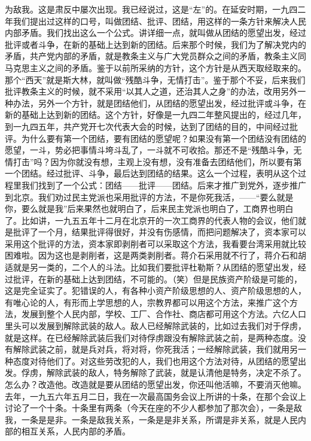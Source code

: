 为敌我。这是肃反中屡次出现。我已经说过，这是“左”的。在延安时期，一九四二年我们提出过这样的口号，叫做团结、批评、团结，用这样的一条方针来解决人民内部矛盾。我们找出这么一个公式。讲详细一点，就叫做从团结的愿望出发，经过批评或者斗争，在新的基础上达到新的团结。后来那个时候，我们为了解决党内的矛盾，共产党内部的矛盾，就是教条主义与广大党员群众之间的矛盾，教条主义同马克思主义之间的矛盾。鉴于以前所采纳的方针，这个方针是从西天取经取来的。那个“西天”就是斯大林，就叫做“残酷斗争，无情打击”。鉴于那个不妥，后来我们批评教条主义的时候，就不采用“以其人之道，还治其人之身”的办法，改用另外一种办法，另外一个方针，就是团结他们，从团结的愿望出发，经过批评或斗争，在新的基础上达到新的团结。这个方针，好像是一九四二年整风提出的，经过几年，到一九四五年，共产党开七次代表大会的时候，达到了团结的目的，中间经过批评。为什么要有第一个团结，要有团结的愿望呢？如果没有第一个团结没有团结的愿望，一斗，势必把事情斗垮斗乱了，一斗就不可收拾。那还不是“残酷斗争，无情打击”吗？因为你就没有想，主观上没有想，没有准备去团结他们，所以要有第一个团结。经过批评、斗争，最后达到团结的结果。这么一个过程，表明从这个过程里我们找到了一个公式：团结——批评——团结。后来才推广到党外，逐步推广到北京。我们劝过民主党派也采用批评的方法，不是你死我活，——“要么就是你，要么就是我”后来果然也就明白了，后来民主党派也明白了，工商界也明白了。比如讲，一九五五年十二月在北京开的一次工商界的代表人物的会议，他们就是批评了一个月，结果批评得很好，并没有伤感情，而把问题解决了，资本家可以采用这个批评的方法，资本家即剥削者可以采取这个方法，我看要台湾采用就比较困难啦。因为这也是剥削者，这是两类剥削者。蒋介石采用就不行了，蒋介石和胡适就是另一类的，二个人的斗法。比如我们要批评杜勒斯？从团结的愿望出发，经过批评，在新的基础上达到团结，不可能的。（笑）但是民族资产阶级是可能的，这是完全证实了。犯错误的人，有各种小资产阶级思想的人、资产阶级思想的人，有唯心论的人，有形而上学思想的人，宗教界都可以用这个方法，来推广这个方法，发展到整个人民内部，学校、工厂、合作社、商店都可用这个方法。六亿人口里头可以发展到解除武装的敌人。敌人已经解除武装的，比如过去我们对于俘虏，就是这样。在已经解除武装后我们对待俘虏跟没有解除武装之前，是两种态度。没有解除武装之前，就是兵对兵，将对将，你死我活；一经解除武装，我们就用另一种态度对待他们了。对这些劳改犯的人，我们也用这个方法对待，从团结的愿望出发。俘虏，解除武装的敌人，特务解除了武装，就是认清他是特务，决定不杀了。怎么办？改造他。改造就是要从团结的愿望出发，你还叫他活嘛，不要消灭他嘛。去年，一九五六年五月二日，我在一次最高国务会议上所讲的十条，在那个会议上讨论了一个十条。十条里有两条（今天在座的不少人都参加了那次会），一条是敌我，一条是是非。一条是敌我关系，一条是是非关系，所谓是非关系，就是人民内部的相互关系，人民内部的矛盾。

